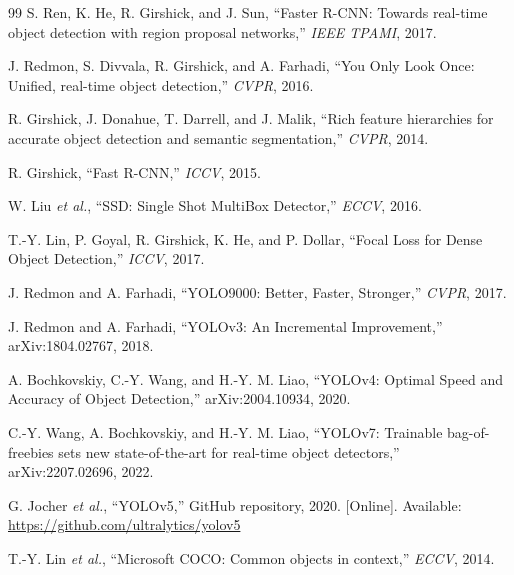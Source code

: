 \documentclass[conference]{IEEEtran}
\begin{document}
\begin{thebibliography}{99}
S. Ren, K. He, R. Girshick, and J. Sun, ``Faster R-CNN: Towards real-time object detection with region proposal networks,'' \emph{IEEE TPAMI}, 2017.

J. Redmon, S. Divvala, R. Girshick, and A. Farhadi, ``You Only Look Once: Unified, real-time object detection,'' \emph{CVPR}, 2016.

R. Girshick, J. Donahue, T. Darrell, and J. Malik, ``Rich feature hierarchies for accurate object detection and semantic segmentation,'' \emph{CVPR}, 2014.

R. Girshick, ``Fast R-CNN,'' \emph{ICCV}, 2015.

W. Liu \emph{et al.}, ``SSD: Single Shot MultiBox Detector,'' \emph{ECCV}, 2016.

T.-Y. Lin, P. Goyal, R. Girshick, K. He, and P. Dollar, ``Focal Loss for Dense Object Detection,'' \emph{ICCV}, 2017.

J. Redmon and A. Farhadi, ``YOLO9000: Better, Faster, Stronger,'' \emph{CVPR}, 2017.

J. Redmon and A. Farhadi, ``YOLOv3: An Incremental Improvement,'' arXiv:1804.02767, 2018.

A. Bochkovskiy, C.-Y. Wang, and H.-Y. M. Liao, ``YOLOv4: Optimal Speed and Accuracy of Object Detection,'' arXiv:2004.10934, 2020.

C.-Y. Wang, A. Bochkovskiy, and H.-Y. M. Liao, ``YOLOv7: Trainable bag-of-freebies sets new state-of-the-art for real-time object detectors,'' arXiv:2207.02696, 2022.

G. Jocher \emph{et al.}, ``YOLOv5,'' GitHub repository, 2020. [Online]. Available: \url{https://github.com/ultralytics/yolov5}

T.-Y. Lin \emph{et al.}, ``Microsoft COCO: Common objects in context,'' \emph{ECCV}, 2014.
\end{thebibliography}
\end{document}

